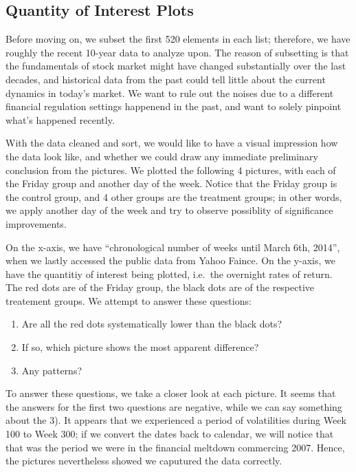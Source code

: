 \documentclass[letterpaper,10pt,english]{/Users/edwsurewin/anaconda/lib/python2.7/site-packages/sphinx/texinputs/sphinxhowto}
\begin{document}
\fi
    
\subsection{Quantity of Interest
Plots}\label{quantity-of-interest-plots}

Before moving on, we subset the first 520 elements in each list;
therefore, we have roughly the recent 10-year data to analyze upon. The
reason of subsetting is that the fundamentals of stock market might have
changed substantially over the last decades, and historical data from
the past could tell little about the current dynamics in today's market.
We want to rule out the noises due to a different financial regulation
settings happenend in the past, and want to solely pinpoint what's
happened recently.

With the data cleaned and sort, we would like to have a visual
impression how the data look like, and whether we could draw any
immediate preliminary conclusion from the pictures. We plotted the
following 4 pictures, with each of the Friday group and another day of
the week. Notice that the Friday group is the control group, and 4 other
groups are the treatment groups; in other words, we apply another day of
the week and try to observe possiblity of significance improvements.

On the x-axis, we have ``chronological number of weeks until March 6th,
2014'', when we lastly accessed the public data from Yahoo Faince. On
the y-axis, we have the quantitiy of interest being plotted, i.e.~the
overnight rates of return. The red dots are of the Friday group, the
black dots are of the respective treatement groups. We attempt to answer
these questions:

\begin{enumerate}
\def\labelenumi{\arabic{enumi})}
\itemsep1pt\parskip0pt
\item
  Are all the red dots systematically lower than the black dots?
\item
  If so, which picture shows the most apparent difference?
\item
  Any patterns?
\end{enumerate}

To answer these questions, we take a closer look at each picture. It
seems that the answers for the first two questions are negative, while
we can say something about the 3). It appears that we experienced a
period of volatilities during Week 100 to Week 300; if we convert the
dates back to calendar, we will notice that that was the period we were
in the financial meltdown commercing 2007. Hence, the pictures
nevertheless showed we caputured the data correctly.
\end{document}
